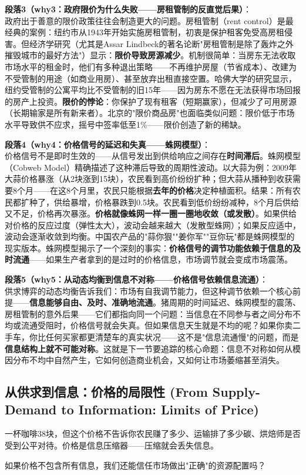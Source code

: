 \documentclass[../main.tex]{subfiles}
\begin{document}
	\textbf{段落3（why3：政府限价为什么失败——房租管制的反直觉后果）}：\\
	政府出于善意的限价政策往往会制造更大的问题。房租管制（rent control）是最经典的案例：纽约市从1943年开始实施房租管制，初衷是保护租客免受高房租侵害。但经济学研究（尤其是Assar Lindbeck的著名论断"房租管制是除了轰炸之外摧毁城市的最好方法"）显示：\textbf{限价导致房源减少}。机制很简单：当房东无法收取市场水平的租金时，他们有多种退出策略——不再维护房屋（节省成本）、改建为不受管制的用途（如商业用房）、甚至放弃出租直接空置。哈佛大学的研究显示，纽约受管制的公寓平均比不受管制的旧15年——因为房东不愿在无法获得市场回报的房产上投资。\textbf{限价的悖论}：你保护了现有租客（短期赢家），但减少了可用房源（长期输家是所有新来者）。北京的"限价商品房"也面临类似问题：限价低于市场水平导致供不应求，摇号中签率低至1\%——限价创造了新的稀缺。

	\textbf{段落4（why4：价格信号的延迟和失真——蛛网模型）}：\\
	价格信号不是即时生效的——从信号发出到供给响应之间存在\textbf{时间滞后}。蛛网模型（Cobweb Model）精确描述了这种滞后导致的周期性波动。以大蒜为例：2009年大蒜价格暴涨（从2块涨到15块），农民看到高价纷纷扩种；但大蒜从播种到收获需要8个月——在这8个月里，农民只能根据\textbf{去年的价格}决定种植面积。结果：所有农民都扩种了，供给暴增，价格暴跌到0.5块。农民看到低价纷纷减种，8个月后供给又不足，价格再次暴涨。\textbf{价格就像蛛网一样一圈一圈地收敛（或发散）}。如果供给对价格的反应过度（弹性太大），波动会越来越大（发散型蛛网）；如果反应适中，波动会逐渐收敛到均衡。中国农产品的"蒜你狠""姜你军""豆你玩"都是蛛网模型的现实版本。蛛网模型揭示了一个深刻的事实：\textbf{价格信号的调节功能依赖于信息的及时流通}——如果生产者拿到的是过时的价格信息，市场调节就会变成市场震荡。

	\textbf{段落5（why5：从动态均衡到信息不对称——价格信号依赖信息流通）}：\\
	供求博弈的动态均衡告诉我们：市场有自我调节能力，但这种调节依赖一个核心前提——\textbf{信息能够自由、及时、准确地流通}。猪周期的时间延迟、蛛网模型的震荡、房租管制的意外后果——它们都指向同一个问题：当信息在不同参与者之间分布不均或流通受阻时，价格信号就会失真。但如果信息天生就是不均的呢？如果你卖二手车，你比任何买家都更清楚车的真实状况——这不是"信息流通慢"的问题，而是\textbf{信息结构上就不可能对称}。这就是下一节要追踪的核心命题：信息不对称如何从模因分布不均中自然产生，它如何创造商业机会，又如何让市场萎缩甚至消失。

	\subsection{从供求到信息：价格的局限性 (From Supply-Demand to Information: Limits of Price)}
	\begin{motivation}
		一杯咖啡38块，但这个价格不告诉你农民赚了多少、运输排了多少碳、烘焙师是否受到公平对待。价格是信息压缩器——压缩就会丢失信息。
	\end{motivation}
	\begin{questionbox}
		如果价格不包含所有信息，我们还能信任市场做出"正确"的资源配置吗？
	\end{questionbox}
\end{document}
